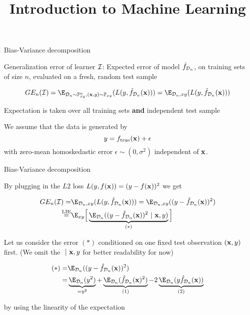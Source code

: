 \documentclass[11pt,compress,t,notes=noshow, xcolor=table]{beamer}
\title{Introduction to Machine Learning}
\begin{document}

\begin{frame}{Bias-Variance decomposition}

Generalization error of learner  $\mathcal{I}$: 
Expected error of model $\hat{f}_{\mathcal{D}_n}$, on training sets of size $n$, evaluated on a fresh, random test sample

$$GE_n(\ind) = \E_{\D_n \sim \Pxy^n, (\xv, y) \sim \Pxy}( L(y, \fh_{\D_n}(\xv)) ) = \E_{\D_n, xy}( L(y, \fh_{\D_n}(\xv)) ) $$

\vfill 

Expectation is taken over all training sets \textbf{and} independent test sample\\

\vfill 

We assume that the data is generated by 
$$
y = f_{\text{true}}(\mathbf{x}) + \epsilon
$$
with zero-mean homoskedastic error $\epsilon \sim (0, \sigma^2)$ independent of $\mathbf{x}$. 

\end{frame}

\begin{frame2}[small]{Bias-Variance decomposition}

By plugging in the $L2$ loss $L(y, f(\mathbf{x})) = (y - f(\mathbf{x}))^2$ we get

\begin{align*}
GE_n(\ind) =& \E_{\D_n, xy}( L(y, \fh_{\D_n}(\xv))) = \E_{\D_n, xy}((y - \fh_{\D_n}(\xv))^2) \\
\stackrel{\text{LIE}}{=}& \E_{xy}\Big[\underbrace{\E_{\D_n}((y - \fh_{\D_n}(\xv))^2~|~ \xv, y)}_{(*)}\Big] 
\end{align*}

Let us consider the error $(*)$ conditioned on one fixed test observation $(\mathbf{x}, y)$ first. (We omit the $~|~\mathbf{x}, y$ for better readability for now)

\begin{align*}
(*) =& \E_{\D_n}((y - \fh_{\D_n}(\xv))^2)\\
=& \underbrace{\E_{\D_n}(y^2)}_{= y^2} + \underbrace{\E_{\D_n}(\fh_{\D_n}(\xv)^2)}_{(1)}  - 2\underbrace{\E_{\D_n}(y\fh_{\D_n}(\xv))}_{(2)} 
\end{align*}

by using the linearity of the expectation %

\end{frame2}
\end{document}
